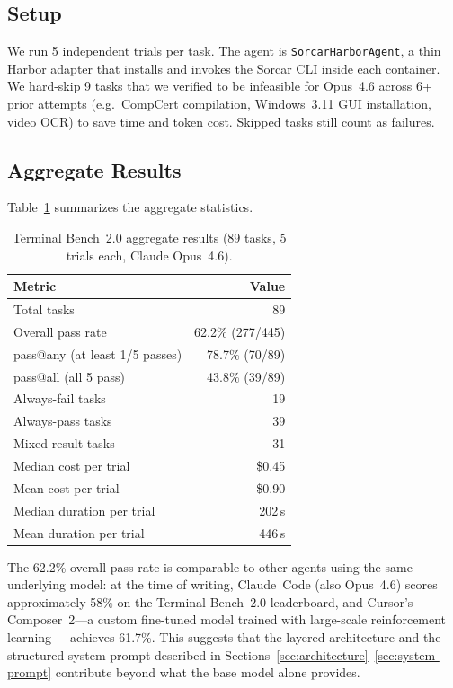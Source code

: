 \documentclass{article}
\begin{document}
\subsection{Setup}

We run 5 independent trials per task.  The agent is \texttt{SorcarHarborAgent}, a thin Harbor adapter that installs and invokes the Sorcar CLI inside each container.  We hard-skip 9 tasks that we verified to be infeasible for Opus~4.6 across 6+ prior attempts (e.g.\ CompCert compilation, Windows~3.11 GUI installation, video OCR) to save time and token cost.  Skipped tasks still count as failures.

\subsection{Aggregate Results}

Table~\ref{tab:tb2-aggregate} summarizes the aggregate statistics.

\begin{table}[h]
\centering
\caption{Terminal Bench~2.0 aggregate results (89 tasks, 5 trials each, Claude Opus~4.6).}
\label{tab:tb2-aggregate}
\begin{tabular}{lr}
\toprule
\textbf{Metric} & \textbf{Value} \\
\midrule
Total tasks              & 89 \\
Overall pass rate        & 62.2\% (277/445) \\
pass@any (at least 1/5 passes) & 78.7\% (70/89) \\
pass@all (all 5 pass)    & 43.8\% (39/89) \\
Always-fail tasks        & 19 \\
Always-pass tasks        & 39 \\
Mixed-result tasks       & 31 \\
Median cost per trial    & \$0.45 \\
Mean cost per trial      & \$0.90 \\
Median duration per trial & 202\,s \\
Mean duration per trial  & 446\,s \\
\bottomrule
\end{tabular}
\end{table}

The 62.2\% overall pass rate is comparable to other agents using the same underlying model: at the time of writing, Claude~Code (also Opus~4.6) scores approximately 58\% on the Terminal Bench~2.0 leaderboard, and Cursor's Composer~2---a custom fine-tuned model trained with large-scale reinforcement learning~\citep{cursor2026composer2}---achieves 61.7\%.  This suggests that the layered architecture and the structured system prompt described in Sections~\ref{sec:architecture}--\ref{sec:system-prompt} contribute beyond what the base model alone provides.
\end{document}
